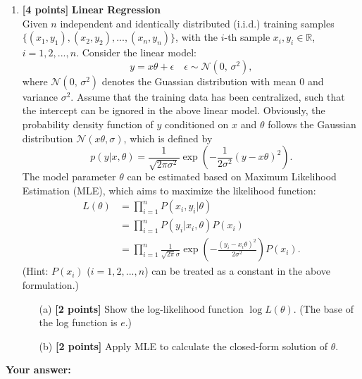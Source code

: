 \documentclass[10pt]{article}
\begin{document}
\begin{enumerate}
\begin{itemize}
	      \end{itemize}



	\item \textbf{[4 points]} \textbf{Linear Regression} \\
	      Given $n$ independent and identically distributed (i.i.d.) training samples
	      $\{(x_1, y_1), (x_2, y_2), ... , (x_n, y_n)\}$, with the $i$-th sample $x_i, y_i \in \mathbb{R}$, $i=1,2,...,n$.
	      Consider the linear model:
	      \begin{equation}
		      y = x\theta + \epsilon \quad \epsilon\sim\mathcal{N}(0,\,\sigma^{2}),
	      \end{equation}
	      where $\mathcal{N}(0,\,\sigma^{2})$ denotes the Guassian distribution with mean 0 and variance $\sigma^2$.
	      Assume that the training data has been centralized, such that the intercept can be ignored in the above linear model.
	      Obviously, the probability density function of $y$ conditioned on $x$ and $\theta$ follows the Gaussian distribution $\mathcal{N}(x\theta,\sigma)$,
	      which is defined by
	      \begin{equation}
		      p(y|x,\theta) = \frac{1}{\sqrt{2\pi\sigma^2}}\exp(-\frac{1}{2\sigma^2}(y-x\theta)^2).
	      \end{equation}
	      The model parameter $\theta$ can be estimated based on Maximum Likelihood Estimation (MLE), which aims to maximize the likelihood function:
	      \begin{align}
		      L(\theta) & = \prod_{i=1}^n P(x_i,y_i|\theta) \nonumber                                                    \\
		                & = \prod_{i=1}^n P(y_i|x_i,\theta)P(x_i) \nonumber                                              \\
		                & = \prod_{i=1}^n \frac{1}{\sqrt{2\pi}\sigma}\exp(-\frac{(y_i - x_i\theta)^2}{2\sigma^2})P(x_i).
	      \end{align}
	      (Hint: $P(x_i)$ ($i=1,2,...,n$) can be treated as a constant in the above formulation.)
	      \begin{itemize}
		      \item[(a)] \textbf{[2 points]} Show the log-likelihood function $\log L(\theta)$. (The base of the log function is $e$.) \\
		      \item[(b)] \textbf{[2 points]} Apply MLE to calculate the closed-form solution of $\theta$. \\
	      \end{itemize}

\end{enumerate}
\newpage
\textbf{Your answer:}
\end{document}
